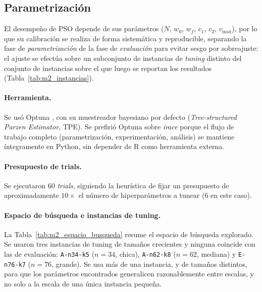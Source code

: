 \subsection{Parametrización}
\label{sec:parametrizacion}

El desempeño de PSO depende de sus parámetros ($N$, $w_0$, $w_f$, $c_1$, $c_2$,
$v_{\max}$), por lo que su calibración se realiza de forma sistemática y reproducible,
separando la fase de \textit{parametrización} de la fase de \textit{evaluación} para
evitar sesgo por sobreajuste: el ajuste se efectúa sobre un subconjunto de instancias de
\textit{tuning} distinto del conjunto de instancias sobre el que luego se reportan los
resultados (Tabla~\ref{tab:m2_instancias}).

\paragraph{Herramienta.} Se usó Optuna \parencite{akiba2019optuna}, con su
muestreador bayesiano por defecto (\textit{Tree-structured Parzen Estimator}, TPE). Se
prefirió Optuna sobre \textit{irace} porque el flujo de trabajo completo (parametrización,
experimentación, análisis) se mantiene íntegramente en Python, sin depender de R como
herramienta externa.

\paragraph{Presupuesto de trials.} Se ejecutaron 60 \textit{trials}, siguiendo la
heurística de fijar un presupuesto de aproximadamente $10\times$ el número de
hiperparámetros a tunear (6 en este caso).

\paragraph{Espacio de búsqueda e instancias de tuning.} La Tabla~\ref{tab:m2_espacio_busqueda}
resume el espacio de búsqueda explorado. Se usaron tres instancias de tuning de tamaños
crecientes y ninguna coincide con las de evaluación: \texttt{A-n34-k5} ($n=34$, chica),
\texttt{A-n62-k8} ($n=62$, mediana) y \texttt{E-n76-k7} ($n=76$, grande). Se usa más de
una instancia, y de tamaños distintos, para que los parámetros encontrados generalicen
razonablemente entre escalas, y no solo a la escala de una única instancia pequeña.

